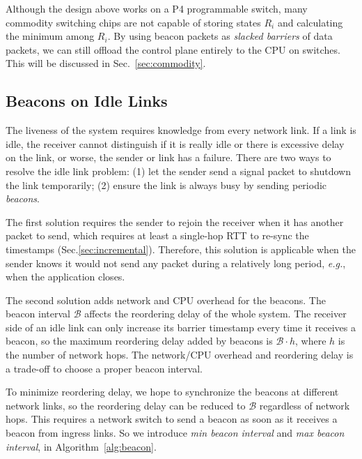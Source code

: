 Although the design above works on a P4 programmable switch, many commodity switching chips are not capable of storing states $R_i$ and calculating the minimum among $R_i$.
By using beacon packets as \textit{slacked barriers} of data packets, we can still offload the control plane entirely to the CPU on switches. This will be discussed in Sec.~\ref{sec:commodity}.

\subsection{Beacons on Idle Links}
\label{sec:beacon}

The liveness of the system requires knowledge from every network link. If a link is idle, the receiver cannot distinguish if it is really idle or there is excessive delay on the link, or worse, the sender or link has a failure. There are two ways to resolve the idle link problem: (1) let the sender send a signal packet to shutdown the link temporarily; (2) ensure the link is always busy by sending periodic \textit{beacons}.

The first solution requires the sender to rejoin the receiver when it has another packet to send, which requires at least a single-hop RTT to re-sync the timestamps (Sec.\ref{sec:incremental}). Therefore, this solution is applicable when the sender knows it would not send any packet during a relatively long period, \textit{e.g.}, when the application closes.

The second solution adds network and CPU overhead for the beacons. The beacon interval $\mathcal{B}$ affects the reordering delay of the whole system. The receiver side of an idle link can only increase its barrier timestamp every time it receives a beacon, so the maximum reordering delay added by beacons is $\mathcal{B} \cdot h$, where $h$ is the number of network hops. The network/CPU overhead and reordering delay is a trade-off to choose a proper beacon interval.

To minimize reordering delay, we hope to synchronize the beacons at different network links, so the reordering delay can be reduced to $\mathcal{B}$ regardless of network hops. This requires a network switch to send a beacon as soon as it receives a beacon from ingress links. So we introduce \textit{min beacon interval} and \textit{max beacon interval}, in Algorithm~\ref{alg:beacon}.

